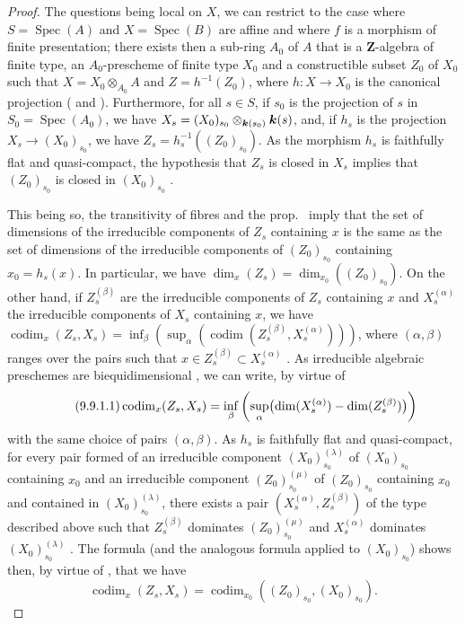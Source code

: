 \begin{proof}
\label{IV.9.9.1-proof}
The questions being local on $X$, we can restrict to the case where $S=\operatorname{Spec}(A)$ and $X=\operatorname{Spec}(B)$ are affine and where $f$ is a morphism of finite presentation; there exists then a sub-ring $A_0$ of $A$ that is a $\mathbf{Z}$-algebra of finite type, an $A_0$-prescheme of finite type $X_0$ and a constructible subset $Z_0$ of $X_0$ such that $X=X_0\otimes_{A_0}A$ and $Z=h^{-1}(Z_0)$, where $h:X\to X_0$ is the canonical projection ( and ).
Furthermore, for all $s\in S$, if $s_0$ is the projection of $s$ in $S_0=\operatorname{Spec}(A_0)$, we have $X_s=(X_0)_{s_0}\otimes_{\boldsymbol{k}(s_0)}\boldsymbol{k}(s)$,
and, if $h_s$ is the projection $X_s\to(X_0)_{s_0}$, we have $Z_s=h_s^{-1}((Z_0)_{s_0})$.
As the morphism $h_s$ is faithfully flat and quasi-compact, the hypothesis that $Z_s$ is closed in $X_s$ implies that $(Z_0)_{s_0}$ is closed in $(X_0)_{s_0}$ .

This being so, the transitivity of fibres  and the prop.~ imply that the set of dimensions of the irreducible components of $Z_s$ containing $x$ is the same as the set of dimensions of the irreducible components of $(Z_0)_{s_0}$ containing $x_0=h_s(x)$.
In particular, we have $\dim_x(Z_s)=\dim_{x_0}((Z_0)_{s_0})$.
On the other hand, if $Z_s^{(\beta)}$ are the irreducible components of $Z_s$ containing $x$ and $X_s^{(\alpha)}$ the irreducible components of $X_s$
containing $x$, we have $\operatorname{codim}_x(Z_s,X_s)
=\inf_\beta(\sup_\alpha(\operatorname{codim}(Z_s^{(\beta)},X_s^{(\alpha)})))$,
where $(\alpha,\beta)$ ranges over the pairs such that $x\in Z_s^{(\beta)}\subset X_s^{(\alpha)}$ .
As irreducible algebraic preschemes are biequidimensional , we can write, by virtue of 
\begin{equation}
\tag{9.9.1.1}
\label{IV.9.9.1.1}
  \operatorname{codim}_x(Z_s,X_s)=\inf_\beta\left(\sup_\alpha\bigl(\dim(X_s^{(\alpha)})-\dim(Z_s^{(\beta)})\bigr)\right)
\end{equation}
with the same choice of pairs $(\alpha,\beta)$.
As $h_s$ is faithfully flat and quasi-compact, for every pair formed of an irreducible component $(X_0)_{s_0}^{(\lambda)}$ of $(X_0)_{s_0}$ containing $x_0$ and an irreducible component $(Z_0)_{s_0}^{(\mu)}$ of $(Z_0)_{s_0}$ containing $x_0$ and contained in $(X_0)_{s_0}^{(\lambda)}$, there exists a pair $(X_s^{(\alpha)},Z_s^{(\beta)})$ of the type described above such that $Z_s^{(\beta)}$ dominates $(Z_0)_{s_0}^{(\mu)}$ and $X_s^{(\alpha)}$ dominates $(X_0)_{s_0}^{(\lambda)}$ .
The formula  (and the analogous formula applied to $(X_0)_{s_0}$) shows then, by virtue of , that we have
\[
  \operatorname{codim}_x(Z_s,X_s)=\operatorname{codim}_{x_0}((Z_0)_{s_0},(X_0)_{s_0}).
\]


\end{proof}
